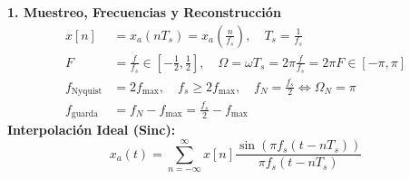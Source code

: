 \documentclass[10pt, a4paper, twocolumn]{article}
\begin{document}
\twocolumn[{%
\begin{center}
    {\large \textbf{FORMULARIO DE PROCESAMIENTO DIGITAL DE SEÑALES (PDS)}}\\[2pt]
    {\scriptsize Notación: $t \in \mathbb{R}$ [s], $n \in \mathbb{Z}$ [muestras], $f$ [Hz], $\omega = 2\pi f$ [rad/s], $F = f/f_s$ [ciclos/muestra], $\Omega = 2\pi F$ [rad/muestra]}
    \vspace{2pt}
    \hrule
    \vspace{4pt}
\end{center}
}]

\footnotesize
\setlength{\abovedisplayskip}{2.5pt}
\setlength{\belowdisplayskip}{2.5pt}
\setlength{\abovedisplayshortskip}{1.5pt}
\setlength{\belowdisplayshortskip}{1.5pt}

\textbf{1. Muestreo, Frecuencias y Reconstrucción}
\begin{align*}
    x[n] &= x_a(n T_s) = x_a\left(\frac{n}{f_s}\right), \quad T_s = \frac{1}{f_s} \\
    F &= \frac{f}{f_s} \in \left[-\frac{1}{2}, \frac{1}{2}\right], \quad \Omega = \omega T_s = 2\pi \frac{f}{f_s} = 2\pi F \in [-\pi, \pi] \\
    f_{\text{Nyquist}} &= 2 f_{\max}, \quad f_s \ge 2 f_{\max}, \quad f_N = \frac{f_s}{2} \iff \Omega_N = \pi \\
    f_{\text{guarda}} &= f_N - f_{\max} = \frac{f_s}{2} - f_{\max}
\end{align*}
\textbf{Interpolación Ideal (Sinc):}
\[
    x_a(t) = \sum_{n=-\infty}^{\infty} x[n] \frac{\sin\left(\pi f_s (t - n T_s)\right)}{\pi f_s (t - n T_s)}
\]
\end{document}
